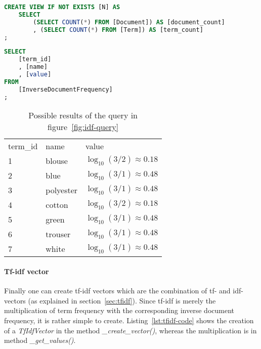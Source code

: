 \begin{lstlisting}[language=SQL,caption={SQL-statement to create the N-view},label={lst:n-view},float=h]
CREATE VIEW IF NOT EXISTS [N] AS
    SELECT
        (SELECT COUNT(*) FROM [Document]) AS [document_count]
        , (SELECT COUNT(*) FROM [Term]) AS [term_count]
;
\end{lstlisting}


\begin{lstlisting}[language=SQL,caption={SQL-query for generating idf-vectors},label={fig:idf-query},float=h]
SELECT
    [term_id]
    , [name]
    , [value]
FROM
    [InverseDocumentFrequency]
;
\end{lstlisting}


\begin{table}
    \center
    \begin{tabular}{ l | l | l }
        \rowcolor{\dustRowHead}
        \multicolumn{3}{ c }{\textbf{idf}}\\\hline
        term\_id    & name      & value\\\hline
        1           & blouse    & $\log_{10}(3/2) \approx 0.18$\\
        2           & blue      & $\log_{10}(3/1) \approx 0.48$\\
        3           & polyester & $\log_{10}(3/1) \approx 0.48$\\
        4           & cotton    & $\log_{10}(3/2) \approx 0.18$\\
        5           & green     & $\log_{10}(3/1) \approx 0.48$\\
        6           & trouser   & $\log_{10}(3/1) \approx 0.48$\\
        7           & white     & $\log_{10}(3/1) \approx 0.48$\\
    \end{tabular}
    \caption{Possible results of the query in figure~\ref{fig:idf-query}}
    \label{tab:idf-query-result}
\end{table}

\FloatBarrier

\paragraph{Tf-idf vector}
Finally one can create tf-idf vectors which are the combination of tf- and idf-vectors (as explained in section~\ref{sec:tfidf}).
Since tf-idf is merely the multiplication of term frequency with the corresponding inverse document frequency, it is rather simple to create.
Listing~\ref{lst:tfidf-code} shows the creation of a \textit{TfIdfVector} in the method \textit{\_create\_vector()}, whereas the multiplication is in method \textit{\_get\_values()}.

